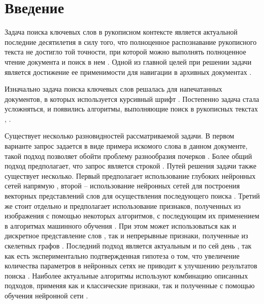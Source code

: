 \documentclass{article}
\begin{document}
\section{Введение}
\par Задача поиска ключевых слов в рукописном контексте является актуальной последние десятилетия в силу того, что полноценное распознавание рукописного текста не достигло той точности, при которой можно выполнять полноценное чтение документа и поиск в нем \citep{10.1007/978-3-031-36616-1_15, SOUIBGUI202243}. Одной из главной целей при решении задачи является достижение ее применимости для навигации в архивных документах \citep{10.1007/978-3-319-13695-0_74, 7333824}. 
\par Изначально задача поиска ключевых слов решалась для напечатанных документов, в которых используется курсивный шрифт \citep{627095}. Постепенно задача стала усложняться, и появились алгоритмы, выполняющие поиск в рукописных текстах \citep{1211511}, .
\par Существует несколько разновидностей рассматриваемой задачи. В первом варианте запрос задается в виде примера искомого слова в данном документе, такой подход позволяет обойти проблему разнообразия почерков \citep{7333824, 8378004}. Более общий подход предполагает, что запрос является строкой \citep{retsinas2021from}. Путей решения задачи также существует несколько. Первый предполагает использование глубоких нейронных сетей напрямую \citep{10.1007/978-3-031-41676-7_26, 10.1007/978-3-031-06555-2_26, Cascianelli2022}, второй -- использование нейронных сетей для построения векторных представлений слов для осуществления последующего поиска \citep{retsinas2021from, Krishnan2023, jemni2023stkeys}. Третий же стоит отдельно и предполагает использование признаков, полученных из изображения с помощью некоторых алгоритмов, с последующим их применением в алгоритмах машинного обучения \citep{8270021, 7333824, 10.1007/978-3-319-49055-7_50, ameri2017keyword, yousfi2021keyword, kundu2021hough}. При этом может использоваться как и дискретное представление слов \citep{8270021, yousfi2021keyword, kundu2021hough, stauffer2016graph}, так и непрерывные признаки, полученные из скелетных графов \citep{7333824, 10.1007/978-3-319-49055-7_50, ameri2017keyword, stauffer2016graph}. Последний подход является актуальным и по сей день \citep{yousfi2021keyword, kundu2021hough, banerjee2022z}, так как есть экспериментально подтвержденная гипотеза о том, что увеличение количества параметров в нейронных сетях не приводит к улучшению результатов поиска \citep{rusakov2018expolring}. Наиболее актуальные алгоритмы используют комбинацию описанных подходов, применяя как и классические признаки, так и полученные с помощью обучения нейронной сети \citep{jemni2023stkeys, omayio2023word}.
\end{document}
